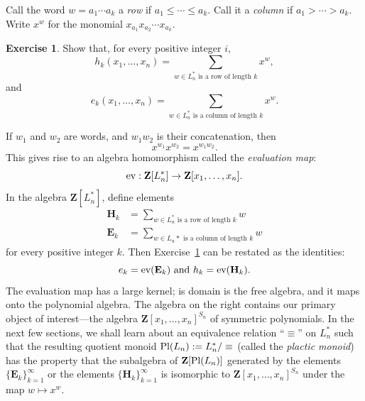 \documentclass[11pt]{amsart}
\theoremstyle{definition}
\theoremstyle{example}
\newtheorem{exercise}[theorem]{Exercise}
\newcommand{\ev}{\textup{ev}}
\newcommand{\pl}{\textup{Pl}}
\begin{document}
Call the word $w=a_1\dotsb a_k$ a \emph{row} if $a_1\leq \dotsb \leq a_k$.
Call it a \emph{column} if $a_1>\dotsb>a_k$.
Write $x^w$ for the monomial $x_{a_1}x_{a_2}\dotsb x_{a_k}$.
\begin{exercise}
  \label{exercise:row-col}
  Show that, for every positive integer $i$,
  \begin{displaymath}
    h_k(x_1,\dotsc, x_n) = \sum_{\text{$w\in L_n^*$ is a row of length $k$}}x^w,
  \end{displaymath}
  and 
  \begin{displaymath}
    e_k(x_1,\dotsc, x_n) = \sum_{\text{$w\in L_n^*$ is a column of length $k$}}x^w.
  \end{displaymath}
\end{exercise}
If $w_1$ and $w_2$ are words, and $w_1w_2$ is their concatenation, then
\begin{displaymath}
  x^{w_1}x^{w_2} = x^{w_1w_2}.
\end{displaymath}
This gives rise to an algebra homomorphism called the \emph{evaluation map}:
\begin{displaymath}
\ev:\mathbf Z[L_n^*]\to \mathbf Z[x_1,\dotsc, x_n].
\end{displaymath}
In the algebra $\mathbf Z[L_n^*]$, define elements
\begin{align*}
  \mathbf H_k & = \sum_{\text{$w\in L_n^*$ is a row of length $k$}} w\\
  \mathbf E_k & = \sum_{\text{$w\in L_n*$ is a column of length $k$}} w
\end{align*}
for every positive integer $k$.
Then Exercise~\ref{exercise:row-col} can be restated as the identities:
\begin{displaymath}
  e_k = \ev(\mathbf E_k) \text{ and } h_k = \ev(\mathbf H_k).
\end{displaymath}
The evaluation map has a large kernel; is domain is the free algebra, and it maps onto the polynomial algebra.
The algebra on the right contains our primary object of interest---the algebra $\mathbf Z[x_1,\dotsc,x_n]^{S_n}$ of symmetric polynomials.
In the next few sections, we shall learn about an equivalence relation ``$\equiv$'' on $L_n^*$ such that the resulting quotient monoid $\pl(L_n):=L_n^*/\equiv$ (called the \emph{plactic monoid}) has the property that the subalgebra of $\mathbf Z[\pl(L_n)]$ generated by the elements $\{\mathbf E_k\}_{k=1}^\infty$ or the elements $\{\mathbf H_k\}_{k=1}^\infty$ is isomorphic to $\mathbf Z[x_1,\dotsc, x_n]^{S_n}$ under the map $w\mapsto x^w$.
\end{document}
